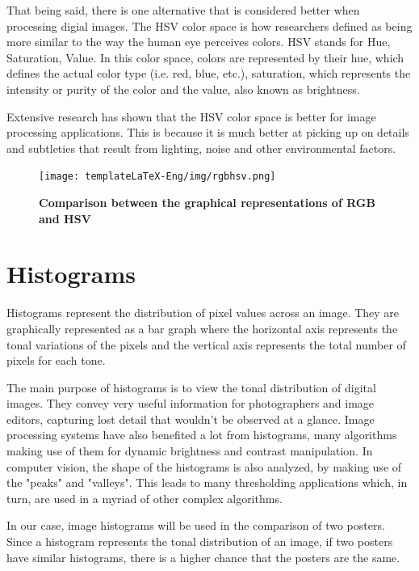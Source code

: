 \documentclass[12pt,a4paper,twoside]{report}
\begin{document}
That being said, there is one alternative that is considered better when processing digial images. The HSV color space is how researchers defined as being more similar to the way the human eye perceives colors. HSV stands for Hue, Saturation, Value. In this color space, colors are represented by their hue, which defines the actual color type (i.e. red, blue, etc.), saturation, which represents the intensity or purity of the color and the value, also known as brightness.

Extensive research has shown that the HSV color space is better for image processing applications. This is because it is much better at picking up on details and subtleties that result from lighting, noise and other environmental factors.
\vspace{1cm}
\begin{figure}[H]
    \begin{center}
        \texttt{[image: templateLaTeX-Eng/img/rgbhsv.png]}
        \caption{\bf Comparison between the graphical representations of RGB and HSV}
    \end{center}
\end{figure}

\section{Histograms}
Histograms represent the distribution of pixel values across an image. They are graphically represented as a bar graph where the horizontal axis represents the tonal variations of the pixels and the vertical axis represents the total number of pixels for each tone.

The main purpose of histograms is to view the tonal distribution of digital images. They convey very useful information for photographers and image editors, capturing lost detail that wouldn't be observed at a glance. Image processing systems have also benefited a lot from histograms, many algorithms making use of them for dynamic brightness and contrast manipulation. In computer vision, the shape of the histograms is also analyzed, by making use of the "peaks" and "valleys". This leads to many thresholding applications which, in turn, are used in a myriad of other complex algorithms. 

In our case, image histograms will be used in the comparison of two posters. Since a histogram represents the tonal distribution of an image, if two posters have similar histograms, there is a higher chance that the posters are the same. 
\end{document}
